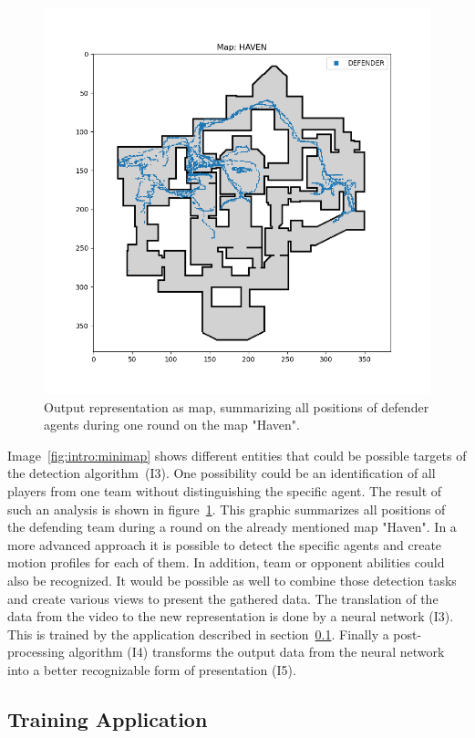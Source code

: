 \begin{figure}
	\centering
	\includegraphics[width=0.8\linewidth]{images/05-output}
	\caption[Output representation as map.]{Output representation as map, summarizing all positions 
	of defender agents during one round on the map "Haven".}
	\label{fig:app:output}
\end{figure}

Image~\ref{fig:intro:minimap} shows different entities that could be possible targets of the detection 
algorithm~(I3). One possibility could be an identification of all players from one team without 
distinguishing the specific agent. The result of such an analysis is shown in 
figure~\ref{fig:app:output}. This graphic summarizes all positions of the defending team during a 
round on the already mentioned map "Haven". In a more advanced approach it is possible to detect 
the specific agents and create motion profiles for each of them. In addition, team or opponent 
abilities could also be recognized. It would be possible as well to combine those detection tasks and 
create various views to present the gathered data. The translation of the data from the video to the 
new representation is done by a neural network (I3). This is trained by the application described in 
section~\ref{subsec:app:trainingapp}. Finally a post-processing algorithm (I4) transforms the output 
data from the neural network into a better recognizable form of presentation (I5).

\subsection{Training Application}\label{subsec:app:trainingapp}

